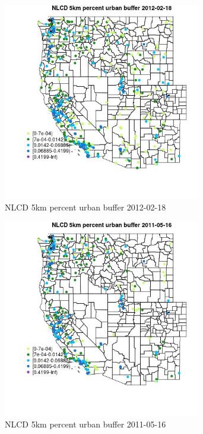 \begin{figure} 
\centering  
\includegraphics[width=0.77\textwidth]{Code_Outputs/Report_ML_input_PM25_Step4_part_f_de_duplicated_aveswNAs_MapObsNLCD_5km_percent_urban_buffer2012-02-18.jpg} 
\caption{\label{fig:Report_ML_input_PM25_Step4_part_f_de_duplicated_aveswNAsMapObsNLCD_5km_percent_urban_buffer2012-02-18}NLCD 5km percent urban buffer 2012-02-18} 
\end{figure} 
 

\begin{figure} 
\centering  
\includegraphics[width=0.77\textwidth]{Code_Outputs/Report_ML_input_PM25_Step4_part_f_de_duplicated_aveswNAs_MapObsNLCD_5km_percent_urban_buffer2011-05-16.jpg} 
\caption{\label{fig:Report_ML_input_PM25_Step4_part_f_de_duplicated_aveswNAsMapObsNLCD_5km_percent_urban_buffer2011-05-16}NLCD 5km percent urban buffer 2011-05-16} 
\end{figure} 
 


